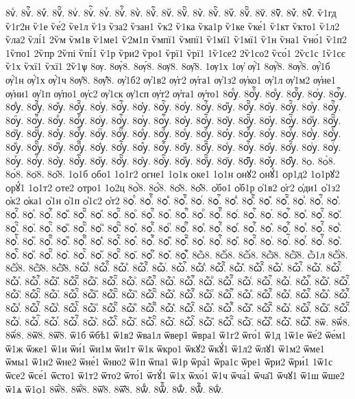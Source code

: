 {8ѵꙴ.
8ѵꙴ҇.
8ѵꙵ.
8ѵꙵ҇.
8ѵꙶ.
8ѵꙶ҇.
8ѵꙷ.
8ѵꙷ҇.
8ѵꙸ.
8ѵꙸ҇.
8ѵꙹ.
8ѵꙹ҇.
8ѵꙺ.
8ѵꙺ҇.
8ѵꙻ.
8ѵꙻ҇.
8ѵ꙼.
8ѵ꙼҇.
8ѵ꙽.
8ѵ꙽҇.
ѷ1гд
ѷ1г2н
ѷ1е
ѷе́2
ѷе1л
ѷ1з
ѷза2
ѷзан1
ѷк2
ѷ1ка
ѷка1р
ѷ1ке
ѷке́1
ѷ1кт
ѷкто1
ѷ1л2
ѷла2
ѷлі́1
2ѷм
ѷм1в
ѷ1ме1
ѷ2м1п
ѷмпї1
ѷмпї1
ѷ1мї1
ѷ1мї1
ѷ1н
ѷна1
ѷно́1
ѷ1п2
1ѷпо1
2ѷпр
2ѷпі
ѷпі́1
ѷ1р
ѷри2
ѷро1
ѷрї1
ѷрї1
1ѷ1се2
2ѷ1со2
ѷсо́1
2ѷс1с
1ѷ1сє
ѷ1х
ѷхї1
ѷхї1
2ѷ1ѱ
8ѹ.
8ѹ̀8.
8ѹ́8.
8ѹ̈8.
8ѹ̑8.
1ѹ1х
1ѹ҆
ѹ҆̀1
8ѹ҆̀8.
8ѹ҆́8.
ѹ҆́1б
ѹ҆́1н
ѹ҆́1х
ѹ҆́1ч
8ѹ҆̈8.
8ѹ҆̑8.
ѹ҆1б2
ѹ҆1в2
ѹ҆г2
ѹ҆га1
ѹ҆1з2
ѹ҆ко1
ѹ҆1л
ѹ҆1м2
ѹ҆не1
ѹ҆ни1
ѹ҆1п
ѹ҆по1
ѹ҆с2
ѹ҆1ск
ѹ҆1сп
ѹ҆т2
ѹ҆та1
ѹ҆то1
8ѹⷠ.
8ѹⷠ҇.
8ѹⷡ.
8ѹⷡ҇.
8ѹⷢ.
8ѹⷢ҇.
8ѹⷣ.
8ѹⷣ҇.
8ѹⷤ.
8ѹⷤ҇.
8ѹⷥ.
8ѹⷥ҇.
8ѹⷦ.
8ѹⷦ҇.
8ѹⷧ.
8ѹⷧ҇.
8ѹⷨ.
8ѹⷨ҇.
8ѹⷩ.
8ѹⷩ҇.
8ѹⷪ.
8ѹⷪ҇.
8ѹⷫ.
8ѹⷫ҇.
8ѹⷬ.
8ѹⷬ҇.
8ѹⷭ.
8ѹⷭ҇.
8ѹⷮ.
8ѹⷮ҇.
8ѹⷯ.
8ѹⷯ҇.
8ѹⷰ.
8ѹⷰ҇.
8ѹⷱ.
8ѹⷱ҇.
8ѹⷲ.
8ѹⷲ҇.
8ѹⷳ.
8ѹⷳ҇.
8ѹⷴ.
8ѹⷴ҇.
8ѹⷵ.
8ѹⷵ҇.
8ѹⷶ.
8ѹⷶ҇.
8ѹⷷ.
8ѹⷷ҇.
8ѹⷸ.
8ѹⷸ҇.
8ѹⷹ.
8ѹⷹ҇.
8ѹⷺ.
8ѹⷺ҇.
8ѹⷻ.
8ѹⷻ҇.
8ѹⷼ.
8ѹⷼ҇.
8ѹⷽ.
8ѹⷽ҇.
8ѹⷾ.
8ѹⷾ҇.
8ѹⷿ.
8ѹⷿ҇.
8ѹꙴ.
8ѹꙴ҇.
8ѹꙵ.
8ѹꙵ҇.
8ѹꙶ.
8ѹꙶ҇.
8ѹꙷ.
8ѹꙷ҇.
8ѹꙸ.
8ѹꙸ҇.
8ѹꙹ.
8ѹꙹ҇.
8ѹꙺ.
8ѹꙺ҇.
8ѹꙻ.
8ѹꙻ҇.
8ѹ꙼.
8ѹ꙼҇.
8ѹ꙽.
8ѹ꙽҇.
8ѻ.
8ѻ̀8.
8ѻ́8.
8ѻ̈8.
8ѻ̑8.
1ѻ1б
ѻбо1
1ѻ1г2
ѻгне1
1ѻ1к
ѻке1
1ѻ1н
ѻнꙋ2
ѻнꙋ́1
ѻр1д2
1ѻ1рꙋ2
ѻрꙋ́1
1ѻ1т2
ѻте2
ѻтро1
1ѻ2ц
8ѻ҆̀8.
8ѻ҆́8.
8ѻ҆̈8.
8ѻ҆̑8.
ѻ҆бо1
ѻ҆б1р
ѻ҆1в2
ѻ҆г2
ѻ҆ди1
ѻ҆1з2
ѻ҆к2
ѻ҆ка1
ѻ҆1н
ѻ҆1п
ѻ҆1с2
ѻ҆т2
8ѻⷠ.
8ѻⷠ҇.
8ѻⷡ.
8ѻⷡ҇.
8ѻⷢ.
8ѻⷢ҇.
8ѻⷣ.
8ѻⷣ҇.
8ѻⷤ.
8ѻⷤ҇.
8ѻⷥ.
8ѻⷥ҇.
8ѻⷦ.
8ѻⷦ҇.
8ѻⷧ.
8ѻⷧ҇.
8ѻⷨ.
8ѻⷨ҇.
8ѻⷩ.
8ѻⷩ҇.
8ѻⷪ.
8ѻⷪ҇.
8ѻⷫ.
8ѻⷫ҇.
8ѻⷬ.
8ѻⷬ҇.
8ѻⷭ.
8ѻⷭ҇.
8ѻⷮ.
8ѻⷮ҇.
8ѻⷯ.
8ѻⷯ҇.
8ѻⷰ.
8ѻⷰ҇.
8ѻⷱ.
8ѻⷱ҇.
8ѻⷲ.
8ѻⷲ҇.
8ѻⷳ.
8ѻⷳ҇.
8ѻⷴ.
8ѻⷴ҇.
8ѻⷵ.
8ѻⷵ҇.
8ѻⷶ.
8ѻⷶ҇.
8ѻⷷ.
8ѻⷷ҇.
8ѻⷸ.
8ѻⷸ҇.
8ѻⷹ.
8ѻⷹ҇.
8ѻⷺ.
8ѻⷺ҇.
8ѻⷻ.
8ѻⷻ҇.
8ѻⷼ.
8ѻⷼ҇.
8ѻⷽ.
8ѻⷽ҇.
8ѻⷾ.
8ѻⷾ҇.
8ѻⷿ.
8ѻⷿ҇.
8ѻꙴ.
8ѻꙴ҇.
8ѻꙵ.
8ѻꙵ҇.
8ѻꙶ.
8ѻꙶ҇.
8ѻꙷ.
8ѻꙷ҇.
8ѻꙸ.
8ѻꙸ҇.
8ѻꙹ.
8ѻꙹ҇.
8ѻꙺ.
8ѻꙺ҇.
8ѻꙻ.
8ѻꙻ҇.
8ѻ꙼.
8ѻ꙼҇.
8ѻ꙽.
8ѻ꙽҇.
8ѽ8.
8ѽ̀8.
8ѽ́8.
8ѽ̈8.
8ѽ̑8.
ѽ1л
8ѽ҆̀8.
8ѽ҆́8.
8ѽ҆̈8.
8ѽ҆̑8.
8ѽⷠ.
8ѽⷠ҇.
8ѽⷡ.
8ѽⷡ҇.
8ѽⷢ.
8ѽⷢ҇.
8ѽⷣ.
8ѽⷣ҇.
8ѽⷤ.
8ѽⷤ҇.
8ѽⷥ.
8ѽⷥ҇.
8ѽⷦ.
8ѽⷦ҇.
8ѽⷧ.
8ѽⷧ҇.
8ѽⷨ.
8ѽⷨ҇.
8ѽⷩ.
8ѽⷩ҇.
8ѽⷪ.
8ѽⷪ҇.
8ѽⷫ.
8ѽⷫ҇.
8ѽⷬ.
8ѽⷬ҇.
8ѽⷭ.
8ѽⷭ҇.
8ѽⷮ.
8ѽⷮ҇.
8ѽⷯ.
8ѽⷯ҇.
8ѽⷰ.
8ѽⷰ҇.
8ѽⷱ.
8ѽⷱ҇.
8ѽⷲ.
8ѽⷲ҇.
8ѽⷳ.
8ѽⷳ҇.
8ѽⷴ.
8ѽⷴ҇.
8ѽⷵ.
8ѽⷵ҇.
8ѽⷶ.
8ѽⷶ҇.
8ѽⷷ.
8ѽⷷ҇.
8ѽⷸ.
8ѽⷸ҇.
8ѽⷹ.
8ѽⷹ҇.
8ѽⷺ.
8ѽⷺ҇.
8ѽⷻ.
8ѽⷻ҇.
8ѽⷼ.
8ѽⷼ҇.
8ѽⷽ.
8ѽⷽ҇.
8ѽⷾ.
8ѽⷾ҇.
8ѽⷿ.
8ѽⷿ҇.
8ѽꙴ.
8ѽꙴ҇.
8ѽꙵ.
8ѽꙵ҇.
8ѽꙶ.
8ѽꙶ҇.
8ѽꙷ.
8ѽꙷ҇.
8ѽꙸ.
8ѽꙸ҇.
8ѽꙹ.
8ѽꙹ҇.
8ѽꙺ.
8ѽꙺ҇.
8ѽꙻ.
8ѽꙻ҇.
8ѽ꙼.
8ѽ꙼҇.
8ѽ꙽.
8ѽ꙽҇.
8ѿ.
8ѿ̀8.
8ѿ́8.
8ѿ̈8.
8ѿ̑8.
ѿ1б
ѿбѣ1
ѿ1в2
ѿва1л
ѿвер1
ѿвра1
ѿ1г2
ѿго́1
ѿ1д
1ѿ1е
ѿе́2
ѿе́м1
ѿ1ж
ѿже1
ѿ1и
ѿи́1
ѿи1м
ѿи1т
ѿ1к
ѿкро1
ѿкꙋ2
ѿкꙋ́1
ѿ1л2
ѿлꙋ1
ѿ1м2
ѿме1
ѿмы1
ѿ1н2
ѿне2
ѿне́1
ѿню2
ѿ1п
ѿпа1
ѿ1р
ѿра́1
ѿра1с
ѿре1
ѿри2
ѿри́1
1ѿ1с
ѿсе2
ѿсе́1
ѿсто1
ѿ1т2
ѿто2
ѿто́1
ѿтꙋ́1
ѿ1х
ѿхо́1
ѿ1ч
ѿча́1
ѿча̑1
ѿчꙋ1
ѿ1ш
ѿше2
ѿ1ѧ
ѿ1ѻ1
8ѿ҆̀8.
8ѿ҆́8.
8ѿ҆̈8.
8ѿ҆̑8.
8ѿⷠ.
8ѿⷠ҇.
8ѿⷡ.
8ѿⷡ҇.
8ѿⷢ.
}
